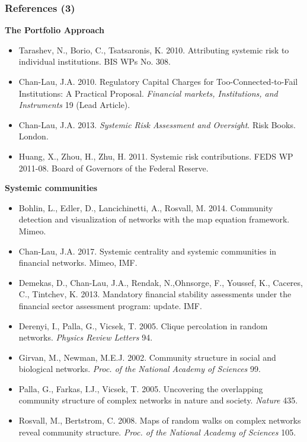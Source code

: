 \documentclass[aspectratio=43,dvipsnames,usenames, svgnames]{beamer}
\begin{document}
\begin{frame} %
\frametitle{References (3)}
\scriptsize{\textbf{The Portfolio Approach}}
\tiny{
\begin{itemize}
	\item Tarashev, N., Borio, C., Tsatsaronis, K. 2010. Attributing systemic risk to individual institutions. BIS WPs No. 308.
	\item Chan-Lau, J.A. 2010. Regulatory Capital Charges for Too-Connected-to-Fail Institutions: A Practical Proposal. \textit{Financial markets, Institutions, and Instruments} 19 (Lead Article).
	\item Chan-Lau, J.A. 2013. \textit{Systemic Risk Assessment and Oversight}. Risk Books. London.
	\item Huang, X., Zhou, H., Zhu, H. 2011. Systemic risk contributions. FEDS WP 2011-08. Board of Governors of the Federal Reserve.
\end{itemize}
}
\vspace{1ex}
\scriptsize{\textbf{Systemic communities}}
\tiny{
\begin{itemize}
	\item Bohlin, L., Edler, D., Lancichinetti, A., Rosvall, M. 2014. Community detection and visualization of networks with the map equation framework. Mimeo.
	\item Chan-Lau, J.A. 2017. Systemic centrality and systemic communities in financial networks. Mimeo, IMF.
	\item Demekas, D., Chan-Lau, J.A., Rendak, N.,Ohnsorge, F., Youssef, K., Caceres, C., Tintchev, K. 2013. Mandatory financial stability assessments under the financial sector assessment program: update. IMF.
	\item Derenyi, I., Palla, G., Vicsek, T. 2005. Clique percolation in random networks. \textit{Physics Review Letters} 94.	
	\item Girvan, M., Newman, M.E.J. 2002. Community structure in social and biological networks. \textit{Proc. of the National Academy of Sciences} 99.
	\item Palla, G., Farkas, I.J., Vicsek, T. 2005. Uncovering the overlapping community structure of complex networks in nature and society. \textit{Nature} 435.
	\item Rosvall, M., Bertstrom, C. 2008. Maps of random walks on complex networks reveal community structure. \textit{Proc. of the National Academy of Sciences} 105.
\end{itemize}
}
\end{frame}
\end{document}
